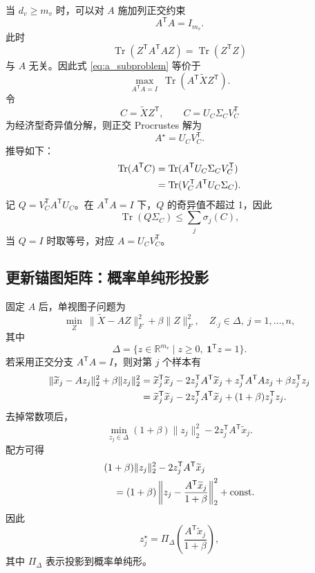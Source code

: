 \documentclass[UTF8,a4paper,12pt,fontset=none]{ctexart}
\newcommand{\R}{\mathbb{R}}
\newcommand{\tr}{\operatorname{Tr}}
\newcommand{\one}{\mathbf{1}}
\newcommand{\T}{\mathsf{T}}
\begin{document}
当 \(d_v\ge m_v\) 时，可以对 \(A\) 施加列正交约束
\begin{equation}
A^\T A=I_{m_v}.
\end{equation}
此时
\begin{equation}
\tr(Z^\T A^\T A Z)=\tr(Z^\T Z)
\end{equation}
与 \(A\) 无关。因此式 \eqref{eq:a_subproblem} 等价于
\begin{equation}
\max_{A^\T A=I}\ \tr(A^\T \widetilde XZ^\T).
\end{equation}
令
\begin{equation}
C=\widetilde XZ^\T,\qquad C=U_C\Sigma_CV_C^\T
\end{equation}
为经济型奇异值分解，则正交 Procrustes 解为
\begin{equation}
A^\star=U_CV_C^\T .
\label{eq:a_procrustes}
\end{equation}
推导如下：
\begin{align}
\tr(A^\T C)
&=\tr(A^\T U_C\Sigma_CV_C^\T) \notag\\
&=\tr(V_C^\T A^\T U_C\Sigma_C).
\end{align}
记 \(Q=V_C^\T A^\T U_C\)。在 \(A^\T A=I\) 下，\(Q\) 的奇异值不超过 1，因此
\begin{equation}
\tr(Q\Sigma_C)\le\sum_j\sigma_j(C),
\end{equation}
当 \(Q=I\) 时取等号，对应 \(A=U_CV_C^\T\)。

\subsection{更新锚图矩阵：概率单纯形投影}

固定 \(A\) 后，单视图子问题为
\begin{equation}
\min_Z\
\|\widetilde X-AZ\|_F^2+\beta\|Z\|_F^2,
\quad
Z_{\cdot j}\in\Delta,\ j=1,\ldots,n,
\label{eq:z_subproblem}
\end{equation}
其中
\begin{equation}
\Delta=\{z\in\R^{m_v}\mid z\ge0,\ \one^\T z=1\}.
\end{equation}
若采用正交分支 \(A^\T A=I\)，则对第 \(j\) 个样本有
\begin{align}
\|\widetilde x_j-Az_j\|_2^2+\beta\|z_j\|_2^2
&=
\widetilde x_j^\T\widetilde x_j
-2z_j^\T A^\T\widetilde x_j
+z_j^\T A^\T A z_j
+\beta z_j^\T z_j \notag\\
&=
\widetilde x_j^\T\widetilde x_j
-2z_j^\T A^\T\widetilde x_j
+(1+\beta)z_j^\T z_j .
\end{align}
去掉常数项后，
\begin{equation}
\min_{z_j\in\Delta}
(1+\beta)\|z_j\|_2^2
-2z_j^\T A^\T\widetilde x_j .
\end{equation}
配方可得
\begin{align}
&(1+\beta)\|z_j\|_2^2
-2z_j^\T A^\T\widetilde x_j \notag\\
&\quad =
(1+\beta)
\left\|
z_j-\frac{A^\T\widetilde x_j}{1+\beta}
\right\|_2^2
+\mathrm{const}.
\end{align}
因此
\begin{equation}
z_j^\star
=
\Pi_{\Delta}
\left(
\frac{A^\T\widetilde x_j}{1+\beta}
\right),
\label{eq:z_projection}
\end{equation}
其中 \(\Pi_{\Delta}\) 表示投影到概率单纯形。
\end{document}
